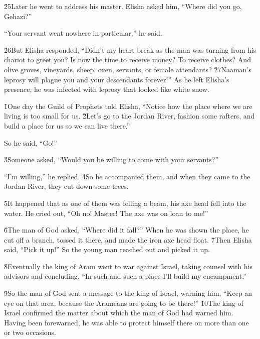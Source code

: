 \v{25}Later he went to address his master. Elisha asked him, ``Where did you go, Gehazi?''

``Your servant went nowhere in particular,'' he said.

\v{26}But Elisha responded, ``Didn't my heart break as the man was turning from his chariot to greet you? Is now the time to receive money? To receive clothes? And olive groves, vineyards, sheep, oxen, servants, or female attendants? \v{27}Naaman's leprosy will plague you and your descendants forever!'' As he left Elisha's presence, he was infected with leprosy that looked like white snow.

\v{1}One day the Guild of Prophets told Elisha, ``Notice how the place where we are living is too small for us. \v{2}Let's go to the Jordan River, fashion some rafters, and build a place for us so we can live there.''

So he said, ``Go!''

\v{3}Someone asked, ``Would you be willing to come with your servants?''

``I'm willing,'' he replied. \v{4}So he accompanied them, and when they came to the Jordan River, they cut down some trees.

\v{5}It happened that as one of them was felling a beam, his axe head fell into the water. He cried out, ``Oh no! Master! The axe was on loan to me!''

\v{6}The man of God asked, ``Where did it fall?'' When he was shown the place, he cut off a branch, tossed it there, and made the iron axe head float. \v{7}Then Elisha said, ``Pick it up!'' So the young man reached out and picked it up.

\v{8}Eventually the king of Aram went to war against Israel, taking counsel with his advisors and concluding, ``In such and such a place I'll build my encampment.''

\v{9}So the man of God sent a message to the king of Israel, warning him, ``Keep an eye on that area, because the Arameans are going to be there!'' \v{10}The king of Israel confirmed the matter about which the man of God had warned him. Having been forewarned, he was able to protect himself there on more than one or two occasions.

